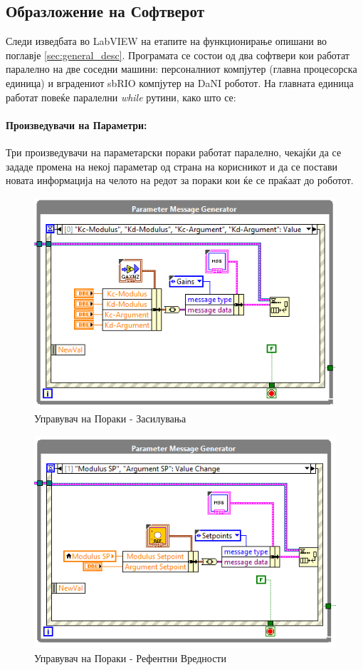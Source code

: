 \documentclass[12pt]{article}
\begin{document}
   \subsection{Образложение на Софтверот} %
    Следи изведбата во LabVIEW на етапите на функционирање опишани во поглавје \ref{sec:general_desc}. Програмата се состои од два софтвери кои работат паралелно на две соседни машини: персоналниот компјутер (главна процесорска единица) и вградениот sbRIO компјутер на DaNI роботот. На главната единица работат повеќе паралелни \textit{while} рутини, како што се:

    \paragraph{Произведувачи на Параметри:\\} %
      Три произведувачи на параметарски пораки работат паралелно, чекајќи да се зададе промена на некој параметар од страна на корисникот и да се постави новата информација на челото на редот за пораки кои ќе се праќаат до роботот.
      \begin{figure}[!h]
          \centering
          \includegraphics[width=0.75\linewidth]{./images/gain_message_generator.PNG}
          \caption{Управувач на Пораки - Засилувања}
        \end{figure}
        \begin{figure}[!h]
          \centering
          \includegraphics[width=0.75\linewidth]{./images/setpoint_message_generator.PNG}
          \caption{Управувач на Пораки - Рефентни Вредности}
        \end{figure}
\end{document}
